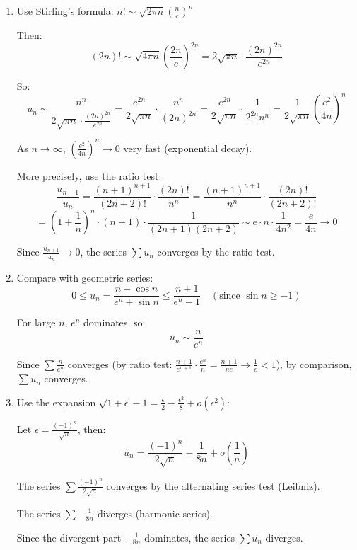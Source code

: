 \documentclass[12pt]{article}
\begin{document}
\begin{answerbox}
\begin{enumerate}
    \item[a)] Use Stirling's formula: $n! \sim \sqrt{2\pi n}\left(\frac{n}{e}\right)^n$
    
    Then:
    \[
    (2n)! \sim \sqrt{4\pi n}\left(\frac{2n}{e}\right)^{2n} = 2\sqrt{\pi n} \cdot \frac{(2n)^{2n}}{e^{2n}}
    \]
    
    So:
    \[
    u_n \sim \frac{n^n}{2\sqrt{\pi n} \cdot \frac{(2n)^{2n}}{e^{2n}}} = \frac{e^{2n}}{2\sqrt{\pi n}} \cdot \frac{n^n}{(2n)^{2n}} = \frac{e^{2n}}{2\sqrt{\pi n}} \cdot \frac{1}{2^{2n} n^n} = \frac{1}{2\sqrt{\pi n}} \left(\frac{e^2}{4n}\right)^n
    \]
    
    As $n \to \infty$, $\left(\frac{e^2}{4n}\right)^n \to 0$ very fast (exponential decay).
    
    More precisely, use the ratio test:
    \[
    \frac{u_{n+1}}{u_n} = \frac{(n+1)^{n+1}}{(2n+2)!} \cdot \frac{(2n)!}{n^n} = \frac{(n+1)^{n+1}}{n^n} \cdot \frac{(2n)!}{(2n+2)!}
    \]
    \[
    = \left(1+\frac{1}{n}\right)^n \cdot (n+1) \cdot \frac{1}{(2n+1)(2n+2)} \sim e \cdot n \cdot \frac{1}{4n^2} = \frac{e}{4n} \to 0
    \]
    
    Since $\frac{u_{n+1}}{u_n} \to 0$, the series $\sum u_n$ converges by the ratio test.
    
    \item[b)] Compare with geometric series:
    \[
    0 \leq u_n = \frac{n + \cos n}{e^n + \sin n} \leq \frac{n+1}{e^n-1} \quad (\text{since } \sin n \geq -1)
    \]
    
    For large $n$, $e^n$ dominates, so:
    \[
    u_n \sim \frac{n}{e^n}
    \]
    
    Since $\sum \frac{n}{e^n}$ converges (by ratio test: $\frac{n+1}{e^{n+1}} \cdot \frac{e^n}{n} = \frac{n+1}{ne} \to \frac{1}{e} < 1$),
    by comparison, $\sum u_n$ converges.
    
    \item[c)] Use the expansion $\sqrt{1+\epsilon} - 1 = \frac{\epsilon}{2} - \frac{\epsilon^2}{8} + o(\epsilon^2)$:
    
    Let $\epsilon = \frac{(-1)^n}{\sqrt{n}}$, then:
    \[
    u_n = \frac{(-1)^n}{2\sqrt{n}} - \frac{1}{8n} + o\left(\frac{1}{n}\right)
    \]
    
    The series $\sum \frac{(-1)^n}{2\sqrt{n}}$ converges by the alternating series test (Leibniz).
    
    The series $\sum -\frac{1}{8n}$ diverges (harmonic series).
    
    Since the divergent part $-\frac{1}{8n}$ dominates, the series $\sum u_n$ diverges.
\end{enumerate}
\end{answerbox}
\end{document}
